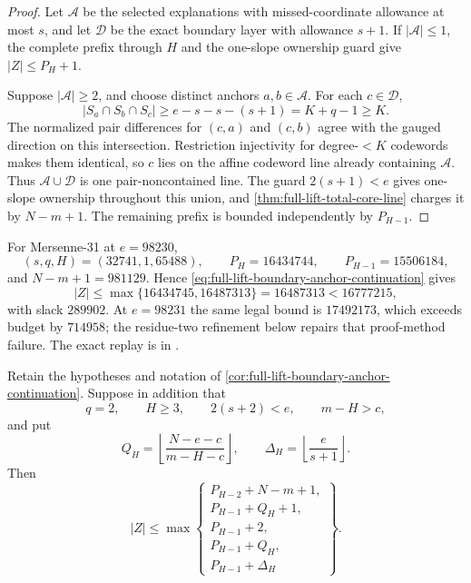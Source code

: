 \documentclass[11pt,a4paper]{amsart}
\numberwithin{equation}{section}
\theoremstyle{remark}
\begin{document}
\begin{proof}
Let $\mathcal A$ be the selected explanations with missed-coordinate
allowance at most $s$, and let $\mathcal D$ be the exact boundary layer
with allowance $s+1$.  If $|\mathcal A|\le1$, the complete prefix through
$H$ and the one-slope ownership guard give $|Z|\le P_H+1$.

Suppose $|\mathcal A|\ge2$, and choose distinct anchors $a,b\in\mathcal A$.
For each $c\in\mathcal D$,
\[
 |S_a\cap S_b\cap S_c|
 \ge e-s-s-(s+1)=K+q-1\ge K.
\]
The normalized pair differences for $(c,a)$ and $(c,b)$ agree with the
gauged direction on this intersection.  Restriction injectivity for
degree-$<K$ codewords makes them identical, so $c$ lies on the affine
codeword line already containing $\mathcal A$.  Thus
$\mathcal A\cup\mathcal D$ is one pair-noncontained line.  The guard
$2(s+1)<e$ gives one-slope ownership throughout this union, and
\cref{thm:full-lift-total-core-line} charges it by $N-m+1$.  The remaining
prefix is bounded independently by $P_{H-1}$.
\end{proof}

\begin{remark}
For Mersenne-31 at $e=98230$,
\[
 (s,q,H)=(32741,1,65488),\qquad
 P_H=16434744,\qquad P_{H-1}=15506184,
\]
and $N-m+1=981129$.  Hence
\eqref{eq:full-lift-boundary-anchor-continuation} gives
\[
 |Z|\le\max\{16434745,16487313\}=16487313<16777215,
\]
with slack $289902$.  At $e=98231$ the same legal bound is $17492173$,
which exceeds budget by $714958$; the residue-two refinement below repairs
that proof-method failure.
The exact replay is in
.
\end{remark}

\begin{corollary}
\label{cor:full-lift-two-boundary-layer-continuation}
Retain the hypotheses and notation of
\cref{cor:full-lift-boundary-anchor-continuation}.  Suppose in addition
that
\[
 q=2,\qquad H\ge3,\qquad 2(s+2)<e,\qquad m-H>c,
\]
and put
\[
 Q_H=\left\lfloor\frac{N-e-c}{m-H-c}\right\rfloor,
 \qquad
 \Delta_H=\left\lfloor\frac{e}{s+1}\right\rfloor.
\]
Then
\begin{equation}
 |Z|\le\max\left\{
 \begin{array}{l}
 P_{H-2}+N-m+1,\\
 P_{H-1}+Q_H+1,\\
 P_{H-1}+2,\\
 P_{H-1}+Q_H,\\
 P_{H-1}+\Delta_H
 \end{array}\right\}.
 \label{eq:full-lift-two-boundary-layer-continuation}
\end{equation}
\end{corollary}
\end{document}
